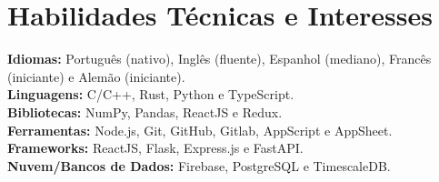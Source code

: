    \vspace{-5.5mm}
  \resumeSubHeadingListEnd
  

\section{\textbf{Habilidades Técnicas e Interesses}}
\begin{itemize}[leftmargin=0.05in, label={}]
    \small{\item{
     \textbf{Idiomas:}{ Português (nativo), Inglês (fluente), Espanhol (mediano), Francês (iniciante) e Alemão (iniciante).} \\
     \textbf{Linguagens:}{ C/C++, Rust, Python e TypeScript. } \\
     \textbf{Bibliotecas:}{ NumPy, Pandas, ReactJS e Redux. }\\ 
     \textbf{Ferramentas:}{ Node.js, Git, GitHub,  Gitlab, AppScript e AppSheet. } \\ 
     \textbf{Frameworks:}{ ReactJS, Flask, Express.js e FastAPI. } \\
     \textbf{Nuvem/Bancos de Dados:}{ Firebase, PostgreSQL e TimescaleDB. } \\  
    }}
\end{itemize}


